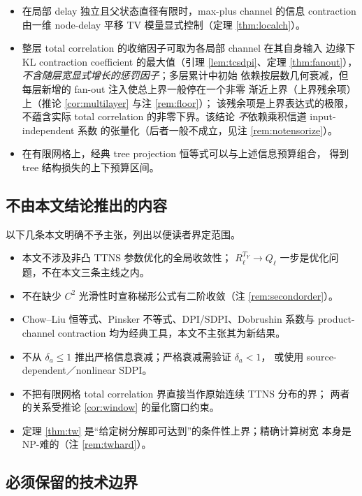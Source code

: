 \documentclass[a4paper,11pt]{article}
\theoremstyle{definition}
\newcommand{\1}{\mathbf 1}
\begin{document}
\begin{itemize}
一个确定性审计脚本生成，联合结构图顶点数超过 $21$ 时为上界而非精确树宽。
\item 在局部 delay 独立且父状态直径有限时，max-plus channel 的信息
contraction 由一维 node-delay 平移 TV 模量显式控制（定理
\ref{thm:localch}）。
\item 整层 total correlation 的收缩因子可取为各局部 channel 在其自身输入
边缘下 KL contraction coefficient 的最大值（引理 \ref{lem:tcsdpi}、定理
\ref{thm:fanout}），\emph{不含随层宽显式增长的惩罚因子}；多层累计中初始
依赖按层数几何衰减，但每层新增的 fan-out 注入使总上界一般停在一个非零
渐近上界（上界残余项）上（推论 \ref{cor:multilayer} 与注 \ref{rem:floor}）；
该残余项是上界表达式的极限，不蕴含实际 total correlation 的非零下界。该结论
\emph{不}依赖乘积信道 input-independent 系数
的张量化（后者一般不成立，见注 \ref{rem:notensorize}）。
\item 在有限网格上，经典 tree projection 恒等式可以与上述信息预算组合，
得到 tree 结构损失的上下预算区间。
\end{itemize}

\subsection{不由本文结论推出的内容}

以下几条本文明确不予主张，列出以便读者界定范围。

\begin{itemize}
\item 本文不涉及非凸 TTNS 参数优化的全局收敛性；
$R_\ell^{T_Y}\to Q_\ell$ 一步是优化问题，不在本文三条主线之内。
\item 不在缺少 $C^2$ 光滑性时宣称梯形公式有二阶收敛（注
\ref{rem:secondorder}）。
\item Chow--Liu 恒等式、Pinsker 不等式、DPI/SDPI、Dobrushin 系数与
product-channel contraction 均为经典工具，本文不主张其为新结果。
\item 不从 $\delta_a\le1$ 推出严格信息衰减；严格衰减需验证 $\delta_a<1$，
或使用 source-dependent／nonlinear SDPI。
\item 不把有限网格 total correlation 界直接当作原始连续 TTNS 分布的界；
两者的关系受推论 \ref{cor:window} 的量化窗口约束。
\item 定理 \ref{thm:tw} 是“给定树分解即可达到”的条件性上界；精确计算树宽
本身是 NP-难的（注 \ref{rem:twhard}）。
\end{itemize}

\subsection{必须保留的技术边界}
\end{document}
